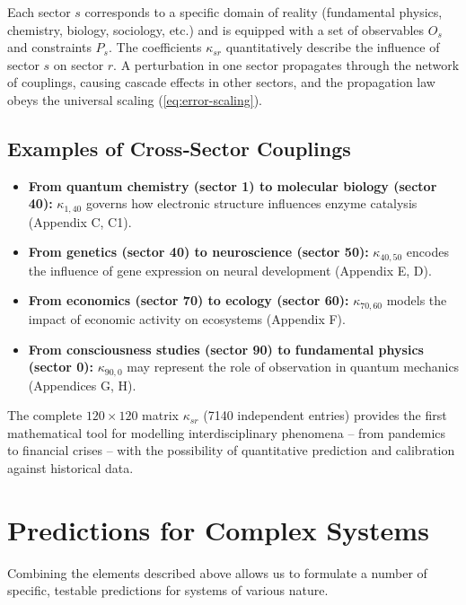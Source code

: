 \documentclass[11pt]{article}
\theoremstyle{remark}
\begin{document}
	Each sector $s$ corresponds to a specific domain of reality (fundamental physics, chemistry, biology, sociology, etc.) and is equipped with a set of observables $O_s$ and constraints $P_s$. The coefficients $\kappa_{sr}$ quantitatively describe the influence of sector $s$ on sector $r$. A perturbation in one sector propagates through the network of couplings, causing cascade effects in other sectors, and the propagation law obeys the universal scaling (\ref{eq:error-scaling}).
	
	\subsection{Examples of Cross‑Sector Couplings}
	\begin{itemize}
		\item \textbf{From quantum chemistry (sector 1) to molecular biology (sector 40):} $\kappa_{1,40}$ governs how electronic structure influences enzyme catalysis (Appendix C, C1).
		\item \textbf{From genetics (sector 40) to neuroscience (sector 50):} $\kappa_{40,50}$ encodes the influence of gene expression on neural development (Appendix E, D).
		\item \textbf{From economics (sector 70) to ecology (sector 60):} $\kappa_{70,60}$ models the impact of economic activity on ecosystems (Appendix F).
		\item \textbf{From consciousness studies (sector 90) to fundamental physics (sector 0):} $\kappa_{90,0}$ may represent the role of observation in quantum mechanics (Appendices G, H).
	\end{itemize}
	
	The complete $120 \times 120$ matrix $\kappa_{sr}$ (7140 independent entries) provides the first mathematical tool for modelling interdisciplinary phenomena – from pandemics to financial crises – with the possibility of quantitative prediction and calibration against historical data.
	
	\section{Predictions for Complex Systems}
	\label{sec:predictions}
	
	Combining the elements described above allows us to formulate a number of specific, testable predictions for systems of various nature.
	
\end{document}
